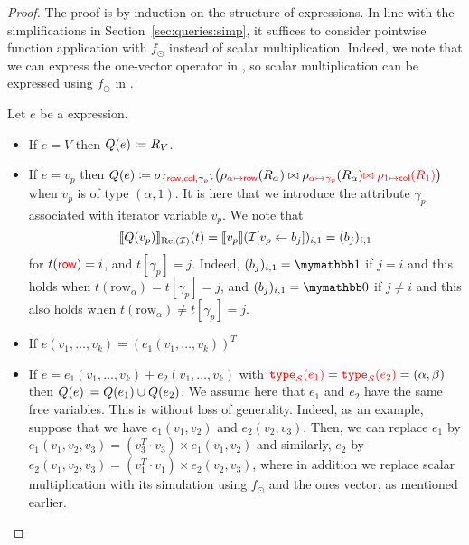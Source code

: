 \begin{proof}
The proof is by induction on the structure of \langsum expressions. In line with the simplifications in Section~\ref{sec:queries:simp}, it suffices to consider pointwise function application with $f_\odot$ instead of scalar multiplication. Indeed, we note that we can express the one-vector operator in \langsum, so scalar multiplication can be expressed using $f_\odot$ in \langsum.

Let $e$ be a \langsum expression.
\begin{itemize}
  \item If $e=V$ then $Q (e)\coloneqq R_V$.
  \item If $e=v_p$ then $Q (e)\coloneqq \sigma_{\lbrace {\color{red} \mathsf{row}},{\color{red} \mathsf{col}},\gamma_p\rbrace}\bigl(\rho_{{\color{red} \alpha\mapsto \mathsf{row}}}(R_\alpha)\bowtie \rho_{{\color{red} \alpha\mapsto\gamma_p}}(R_\alpha){\color{red} \bowtie \rho_{1\mapsto\mathsf{col}}(R_1)}\bigr)$ when  $v_p$ is of type $(\alpha,1)$. It is here that we introduce the attribute $\gamma_p$ associated with iterator variable $v_p$.
 We note that 
$$ \llbracket Q(v_p) \rrbracket_{\text{Rel}(\mathcal{I})}(t)=\llbracket v_p \rrbracket(\mathcal{I}[v_p\gets b_{j}])_{i,1}=(b_j)_{i,1}
$$
for $t({\color{red} \mathsf{row}})=i$,  and $t[\gamma_p]=j$. Indeed, $(b_j)_{i,1}=\kone$ if $j=i$
and this holds when $t(\mathrm{row}_\alpha)=t[\gamma_p]=j$, and $(b_j)_{i,1}=\kzero$ if $j\neq i$
and this also holds when $t(\mathrm{row}_\alpha)\neq t[\gamma_p]=j$.

  \item If $e(v_1,\ldots,v_k)=(e_1(v_1,\ldots,v_k))^T$ %
\item If $e=e_1(v_1,\ldots,v_k)+e_2(v_1,\ldots,v_k)$ with ${\color{red} \texttt{type}_{\mathcal{S}}(e_1)}={\color{red} \texttt{type}_{\mathcal{S}}(e_2)}=(\alpha, \beta)$ then $Q (e)\coloneqq Q (e_1)\cup Q (e_2)$. We assume here that $e_1$ and $e_2$ have the same free variables. This is without loss of generality. Indeed, as an example, suppose that we have $e_1(v_1,v_2)$
and $e_2(v_2,v_3)$. Then, we can replace $e_1$ by  $e_1(v_1,v_2,v_3)=(v_3^T\cdot v_3)\times e_1(v_1,v_2)$
and similarly, $e_2$ by $e_2(v_1,v_2,v_3)=(v_1^T\cdot v_1)\times e_2(v_2,v_3)$, where in addition we replace scalar multiplication with its simulation using $f_{\odot}$ and the ones vector, as mentioned earlier. 


\end{itemize}
\end{proof}
